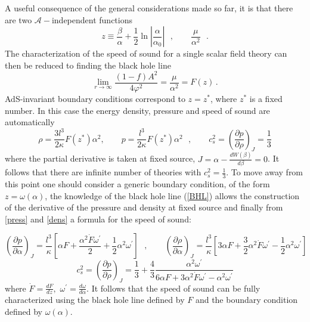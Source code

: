 \documentclass[11pt,epsf,letterpaper]{article}%
\begin{document}
A useful consequence of the general considerations made so far, it is that
there are two $\mathcal{A}-$independent functions
\begin{equation}
z\equiv\frac{\beta}{\alpha}+\frac{1}{2}\ln\left\vert \frac{\alpha}{\alpha_{0}%
}\right\vert \text{ },\qquad\frac{\mu}{\alpha^{2}}\text{ }. \label{Aind}%
\end{equation}
The characterization of the speed of sound for a single scalar field theory
can then be reduced to finding the black hole line%
\begin{equation}
\lim_{r\rightarrow\infty}\frac{\left(  1-f\right)  A^{2}}{4\varphi^{2}}%
=\frac{\mu}{\alpha^{2}}=F(z)\,\text{.} \label{BHL}%
\end{equation}
AdS-invariant boundary conditions correspond to $z=z^{\ast}$, where $z^{\ast}$
is a fixed number. In this case the energy density, pressure and speed of
sound are automatically%
\begin{equation}
\rho=\frac{3l^{3}}{2\kappa}F(z^{\ast})\alpha^{2},\qquad p=\frac{l^{3}}%
{2\kappa}F(z^{\ast})\alpha^{2}\text{ },\qquad c_{s}^{2}=\left(  \frac{\partial
p}{\partial\rho}\right)  _{J}=\frac{1}{3}%
\end{equation}
where the partial derivative is taken at fixed source, $J=\alpha
-\frac{dW(\beta)}{d\beta}=0$. It follows that there are infinite number of
theories with $c_{s}^{2}=\frac{1}{3}$. To move away from this point one should
consider a generic boundary condition, of the form $z=\omega(\alpha)$, the
knowledge of the black hole line (\ref{BHL}) allows the construction of the
derivative of the pressure and density at fixed source and finally from
\eqref{press} and \eqref{dens} a formula for the speed of sound:%

\begin{equation}
\left(  \frac{\partial p}{\partial\alpha}\right)  _{J}=\frac{l^{3}}{\kappa
}\left[  \alpha F+\frac{\alpha^{2}\dot{F}\omega^{\prime}}{2}+\frac{1}{2}%
\alpha^{2}\omega^{\prime}\right]  \text{ },\qquad\left(  \frac{\partial\rho
}{\partial\alpha}\right)  _{J}=\frac{l^{3}}{\kappa}\left[  3\alpha F+\frac
{3}{2}\alpha^{2}\dot{F}\omega^{\prime}-\frac{1}{2}\alpha^{2}\omega^{\prime
}\right]
\end{equation}
\begin{equation}
c_{s}^{2}=\left(  \frac{\partial p}{\partial\rho}\right)  _{J}=\frac{1}%
{3}+\frac{4}{3}\frac{\alpha^{2}\omega^{\prime}}{6\alpha F+3\alpha^{2}\dot
{F}\omega^{\prime}-\alpha^{2}\omega^{\prime}} \label{speed1}%
\end{equation}
where $\dot{F}=\frac{dF}{dz},$ $\omega^{\prime}=\frac{d\omega}{d\alpha}.$ It
follows that the speed of sound can be fully characterized using the black
hole line defined by $F$ and the boundary condition defined by $\omega
(\alpha)$.
\end{document}
